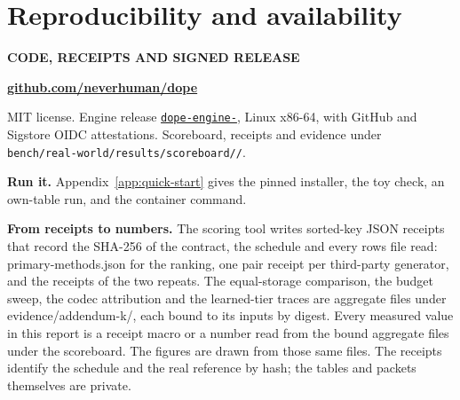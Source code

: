 \documentclass[10pt,letterpaper,twocolumn]{article}
\newcommand{\runin}[1]{\par\smallskip\noindent\textbf{#1.}\hspace{0.45em}\ignorespaces}
\newcommand{\cli}[1]{{\ttfamily\fontsize{8.9}{11}\selectfont #1}}
\begin{document}
\section{Reproducibility and availability}\label{sec:repro}
\begin{tcolorbox}[enhanced,colback=surface,colframe=surface,boxrule=0pt,arc=2.2pt,left=10pt,right=10pt,top=8pt,bottom=8pt,before skip=4pt,after skip=9pt]
\begin{minipage}[c]{\dimexpr\linewidth-1.95cm\relax}\raggedright
{\sffamily\bfseries\fontsize{7.4}{9.5}\selectfont\color{accentdark}CODE, RECEIPTS AND SIGNED RELEASE}\par\vspace{3pt}
{\ttfamily\bfseries\fontsize{10.4}{13}\selectfont\href{https://github.com/neverhuman/dope}{\color{ink}github.com/neverhuman/dope}}\par\vspace{3pt}
{\sffamily\fontsize{7.6}{10.2}\selectfont\color{sub}MIT license. Engine release \href{https://github.com/neverhuman/dope/releases/tag/dope-engine-\VThree{ReleaseVersion}}{\color{sub}\texttt{dope-engine-}}, Linux x86-64, with GitHub and Sigstore OIDC attestations. Scoreboard, receipts and evidence under \texttt{bench/\allowbreak real-world/\allowbreak results/\allowbreak scoreboard/\allowbreak {}/}.\par}
\end{minipage}\hfill
\begin{minipage}[c]{1.6cm}\raggedleft\color{ink}\end{minipage}
\end{tcolorbox}

\runin{Run it} Appendix~\ref{app:quick-start} gives the pinned installer, the toy check, an own-table run, and the container command.

\runin{From receipts to numbers} The scoring tool writes sorted-key JSON receipts that record the SHA-256 of the contract, the schedule and every rows file read: \cli{primary-methods.json} for the ranking, one pair receipt per third-party generator, and the receipts of the two repeats. The equal-storage comparison, the budget sweep, the codec attribution and the learned-tier traces are aggregate files under \cli{evidence/addendum-k/}, each bound to its inputs by digest. Every measured value in this report is a receipt macro or a number read from the bound aggregate files under the  scoreboard. The figures are drawn from those same files. The receipts identify the schedule and the real reference by hash; the tables and packets themselves are private.
\end{document}
